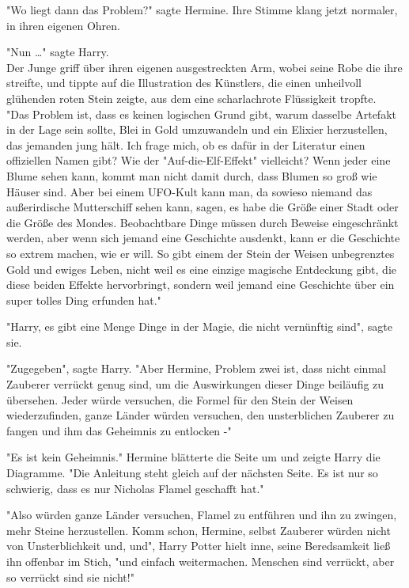 {"Wo liegt dann das Problem?" sagte Hermine. Ihre Stimme klang jetzt normaler, in ihren eigenen Ohren.

"Nun …" sagte Harry.\\ Der Junge griff über ihren eigenen ausgestreckten Arm, wobei seine Robe die ihre streifte, und tippte auf die Illustration des Künstlers, die einen unheilvoll glühenden roten Stein zeigte, aus dem eine scharlachrote Flüssigkeit tropfte.\\ "Das Problem ist, dass es keinen logischen Grund gibt, warum dasselbe Artefakt in der Lage sein sollte, Blei in Gold umzuwandeln und ein Elixier herzustellen, das jemanden jung hält. Ich frage mich, ob es dafür in der Literatur einen offiziellen Namen gibt? Wie der "Auf-die-Elf-Effekt" vielleicht? Wenn jeder eine Blume sehen kann, kommt man nicht damit durch, dass Blumen so groß wie Häuser sind. Aber bei einem UFO-Kult kann man, da sowieso niemand das außerirdische Mutterschiff sehen kann, sagen, es habe die Größe einer Stadt oder die Größe des Mondes. Beobachtbare Dinge müssen durch Beweise eingeschränkt werden, aber wenn sich jemand eine Geschichte ausdenkt, kann er die Geschichte so extrem machen, wie er will. So gibt einem der Stein der Weisen unbegrenztes Gold und ewiges Leben, nicht weil es eine einzige magische Entdeckung gibt, die diese beiden Effekte hervorbringt, sondern weil jemand eine Geschichte über ein super tolles Ding erfunden hat."

"Harry, es gibt eine Menge Dinge in der Magie, die nicht vernünftig sind", sagte sie.

"Zugegeben", sagte Harry. "Aber Hermine, Problem zwei ist, dass nicht einmal Zauberer verrückt genug sind, um die Auswirkungen dieser Dinge beiläufig zu übersehen. Jeder würde versuchen, die Formel für den Stein der Weisen wiederzufinden, ganze Länder würden versuchen, den unsterblichen Zauberer zu fangen und ihm das Geheimnis zu entlocken -"

"Es ist kein Geheimnis." Hermine blätterte die Seite um und zeigte Harry die Diagramme. "Die Anleitung steht gleich auf der nächsten Seite. Es ist nur so schwierig, dass es nur Nicholas Flamel geschafft hat."

"Also würden ganze Länder versuchen, Flamel zu entführen und ihn zu zwingen, mehr Steine herzustellen. Komm schon, Hermine, selbst Zauberer würden nicht von Unsterblichkeit und, und", Harry Potter hielt inne, seine Beredsamkeit ließ ihn offenbar im Stich, "und einfach weitermachen. Menschen sind verrückt, aber so verrückt sind sie nicht!"

}
